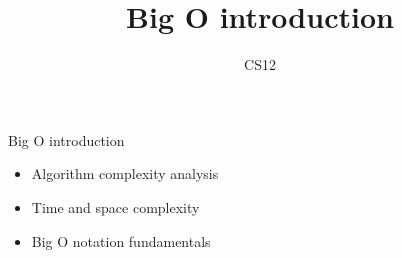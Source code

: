 \documentclass{beamer}
\title{Big O introduction}
\author{CS12}
\date{}
\begin{document}
\begin{frame}
    \titlepage
\end{frame}

\begin{frame}{Big O introduction}
    \begin{itemize}
        \item Algorithm complexity analysis
        \item Time and space complexity
        \item Big O notation fundamentals
    \end{itemize}
\end{frame}
\end{document}
